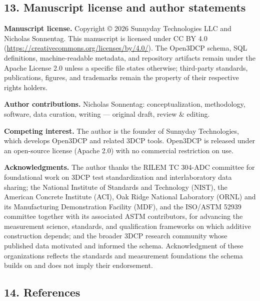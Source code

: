 \documentclass[
  11pt,
  letterpaper,
]{article}
\begin{document}
\subsection{13. Manuscript license and author
statements}\label{manuscript-license-and-author-statements}

\textbf{Manuscript license.} Copyright © 2026 Sunnyday Technologies LLC
and Nicholas Sonnentag. This manuscript is licensed under CC BY 4.0
(\url{https://creativecommons.org/licenses/by/4.0/}). The Open3DCP
schema, SQL definitions, machine-readable metadata, and repository
artifacts remain under the Apache License 2.0 unless a specific file
states otherwise; third-party standards, publications, figures, and
trademarks remain the property of their respective rights holders.

\textbf{Author contributions.} Nicholas Sonnentag: conceptualization,
methodology, software, data curation, writing --- original draft, review
\& editing.

\textbf{Competing interest.} The author is the founder of Sunnyday
Technologies, which develops Open3DCP and related 3DCP tools. Open3DCP
is released under an open-source license (Apache 2.0) with no commercial
restriction on use.

\textbf{Acknowledgments.} The author thanks the RILEM TC 304-ADC
committee for foundational work on 3DCP test standardization and
interlaboratory data sharing; the National Institute of Standards and
Technology (NIST), the American Concrete Institute (ACI), Oak Ridge
National Laboratory (ORNL) and its Manufacturing Demonstration Facility
(MDF), and the ISO/ASTM 52939 committee together with its associated
ASTM contributors, for advancing the measurement science, standards, and
qualification frameworks on which additive construction depends; and the
broader 3DCP research community whose published data motivated and
informed the schema. Acknowledgment of these organizations reflects the
standards and measurement foundations the schema builds on and does not
imply their endorsement.

\subsection{14. References}\label{references}
\end{document}

